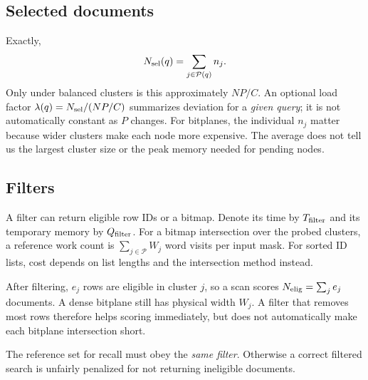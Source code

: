 \subsection{Selected documents}
Exactly,
\begin{equation}
N_{\mathrm{sel}}(q)=\sum_{j\in\mathcal P(q)}n_j.
\label{eq:selected}
\end{equation}
Only under balanced clusters is this approximately $NP/C$. An optional load factor
$\lambda(q)=N_{\mathrm{sel}}/(NP/C)$ summarizes deviation for a \emph{given query}; it is not automatically
constant as $P$ changes. For bitplanes, the individual $n_j$ matter because wider clusters
make each node more expensive. The average does not tell us the largest cluster size or
the peak memory needed for pending nodes.

\subsection{Filters}
A filter can return eligible row IDs or a bitmap. Denote its time by $T_{\rm filter}$ and
its temporary memory by $Q_{\rm filter}$. For a bitmap intersection over the probed clusters, a reference
work count is $\sum_{j\in\mathcal P}W_j$ word visits per input mask. For sorted ID lists, cost
depends on list lengths and the intersection method instead.

After filtering, $e_j$ rows are eligible in cluster $j$, so a scan scores
$N_{\mathrm{elig}}=\sum_j e_j$ documents. A dense bitplane still has physical width $W_j$. A filter that
removes most rows therefore helps scoring immediately, but does not automatically make each
bitplane intersection short.

The reference set for recall must obey the \emph{same filter}. Otherwise a correct filtered
search is unfairly penalized for not returning ineligible documents.

